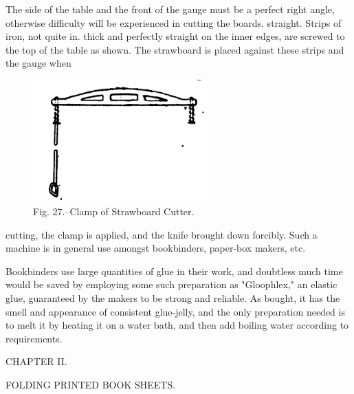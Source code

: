\documentclass[twoside]{book}
\begin{document}
The side of the table and the front of the
gauge must be a perfect right angle, otherwise
difficulty will be experienced in cutting the boards.
straight. Strips of iron, not quite in. thick and
perfectly straight on the inner edges, are screwed
\pagebreak
to the top of the table as shown. The strawboard
is placed against these strips and the gauge when
	\begin{figure}[h]
		\centering
		\includegraphics[width=0.6\textwidth]{Figures/_027.png}
		\caption*{Fig. 27.--Clamp of Strawboard Cutter.}
	\end{figure}
cutting, the clamp is applied, and the knife brought
down forcibly. Such a machine is in general use
amongst bookbinders, paper-box makers, etc.

Bookbinders use large quantities of glue in their
work, and doubtless much time would be saved by
employing some such preparation as "Gloophlex," an
elastic glue, guaranteed by the makers to be strong
and reliable. As bought, it has the smell and appearance
of consistent glue-jelly, and the only preparation
needed is to melt it by heating it on a water bath, and
then add boiling water according to requirements.

\vspace*{\fill}

\pagebreak


\thispagestyle{empty}

\vspace*{\fill}

\begin{center}

\begin{large}CHAPTER II.\end{large}

\begin{small}FOLDING PRINTED BOOK SHEETS.\end{small}

\end{center}
\end{document}
